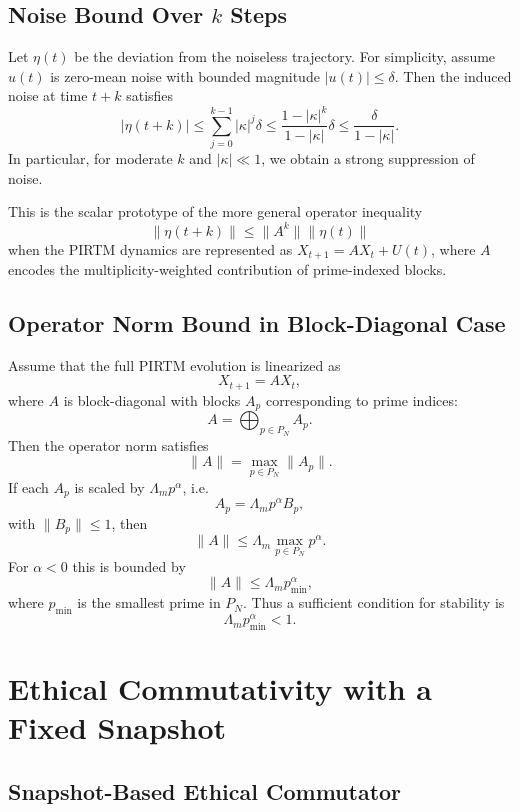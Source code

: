 \documentclass[11pt]{article}
\begin{document}
\subsection{Noise Bound Over $k$ Steps}

Let $\eta(t)$ be the deviation from the noiseless trajectory.
For simplicity, assume $u(t)$ is zero-mean noise with bounded magnitude $\lvert u(t) \rvert \le \delta$.
Then the induced noise at time $t+k$ satisfies
\begin{equation}
  \lvert \eta(t+k) \rvert
  \le \sum_{j=0}^{k-1} \lvert \kappa \rvert^j \delta
  \le \frac{1 - \lvert \kappa \rvert^k}{1 - \lvert \kappa \rvert} \delta
  \le \frac{\delta}{1 - \lvert \kappa \rvert}.
\end{equation}
In particular, for moderate $k$ and $\lvert \kappa \rvert \ll 1$, we obtain a strong suppression of noise.

This is the scalar prototype of the more general operator inequality
\[
  \lVert \eta(t+k) \rVert \le \lVert A^k \rVert \lVert \eta(t) \rVert
\]
when the PIRTM dynamics are represented as $X_{t+1} = A X_t + U(t)$, where $A$ encodes the multiplicity-weighted contribution of prime-indexed blocks.

\subsection{Operator Norm Bound in Block-Diagonal Case}

Assume that the full PIRTM evolution is linearized as
\[
  X_{t+1} = A X_t,
\]
where $A$ is block-diagonal with blocks $A_p$ corresponding to prime indices:
\[
  A = \bigoplus_{p \in P_N} A_p.
\]
Then the operator norm satisfies
\[
  \lVert A \rVert = \max_{p \in P_N} \lVert A_p \rVert.
\]
If each $A_p$ is scaled by $\Lambda_m p^\alpha$, i.e.
\[
  A_p = \Lambda_m p^\alpha B_p,
\]
with $\lVert B_p \rVert \le 1$, then
\[
  \lVert A \rVert
  \le \Lambda_m \max_{p \in P_N} p^\alpha.
\]
For $\alpha < 0$ this is bounded by
\[
  \lVert A \rVert
  \le \Lambda_m p_{\min}^\alpha,
\]
where $p_{\min}$ is the smallest prime in $P_N$.
Thus a sufficient condition for stability is
\[
  \Lambda_m p_{\min}^\alpha < 1.
\]

\section{Ethical Commutativity with a Fixed Snapshot}

\subsection{Snapshot-Based Ethical Commutator}
\end{document}
